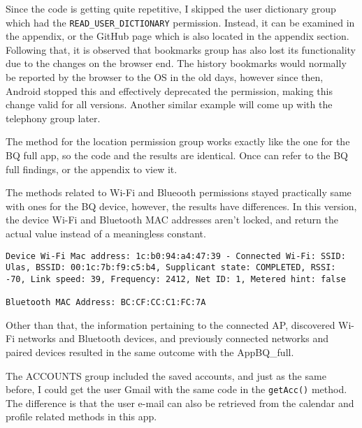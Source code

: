 \documentclass[
  a4paper,  %
  twoside,  %
  bibliography=totoc,
  headsepline,
  cleardoublepage=empty,
  parskip=half,
  draft=false,
  open=any
]{scrbook}
\begin{document}
Since the code is getting quite repetitive, I skipped the user dictionary group which had the \texttt{READ\_USER\_DICTIONARY} permission. Instead, it can be examined in the appendix, or the GitHub page which is also located in the appendix section. Following that, it is observed that bookmarks group has also lost its functionality due to the changes on the browser end. The history bookmarks would normally be reported by the browser to the OS in the old days, however since then, Android stopped this and effectively deprecated the permission, making this change valid for all versions. Another similar example will come up with the telephony group later.

The method for the location permission group works exactly like the one for the BQ full app, so the code and the results are identical. Once can refer to the BQ full findings, or the appendix to view it.

The methods related to Wi-Fi and Blueooth permissions stayed practically same with ones for the BQ device, however, the results have differences. In this version, the device Wi-Fi and Bluetooth MAC addresses aren't locked, and return the actual value instead of a meaningless constant.
\begin{lstlisting}
Device Wi-Fi Mac address: 1c:b0:94:a4:47:39 - Connected Wi-Fi: SSID: Ulas, BSSID: 00:1c:7b:f9:c5:b4, Supplicant state: COMPLETED, RSSI: -70, Link speed: 39, Frequency: 2412, Net ID: 1, Metered hint: false

Bluetooth MAC Address: BC:CF:CC:C1:FC:7A
\end{lstlisting}
Other than that, the information pertaining to the connected AP, discovered Wi-Fi networks and Bluetooth devices, and previously connected networks and paired devices resulted in the same outcome with the AppBQ\_full.

The ACCOUNTS group included the saved accounts, and just as the same before, I could get the user Gmail with the same code in the \texttt{getAcc()} method. The difference is that the user e-mail can also be retrieved from the calendar and profile related methods in this app.
\end{document}
